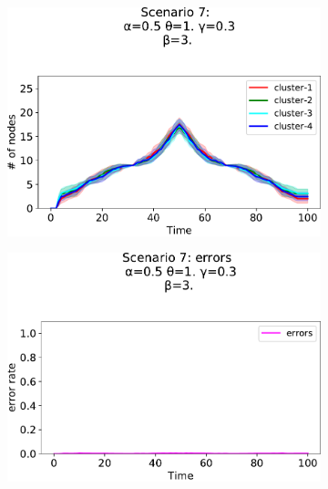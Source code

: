 \begin{figure}[!ht]
\begin{subfigure}[b]{0.32\textwidth}
    \includegraphics[width=\textwidth]{papers/swarm-intelligence2021/img/simulations/standard-updatable-count_0_03456_α-0.5_θ-1._γ-0.3_β-3._ω-0._ζ-0..pdf}
  \end{subfigure}
  \hfill
  \begin{subfigure}[b]{0.32\textwidth}
    \centering
    \includegraphics[width=\textwidth]{papers/swarm-intelligence2021/img/simulations/standard-updatable-errors_0_08_α-0.5_θ-1._γ-0.3_β-3._ω-0._ζ-0..pdf}
  \end{subfigure}
  \hfill
  \begin{subfigure}[b]{0.32\textwidth}
    \centering

\end{subfigure}
\end{figure}
